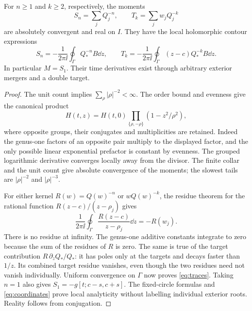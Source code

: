 \begin{proposition}\label{prop:trace}
For $n\ge1$ and $k\ge2$, respectively, the moments
\begin{equation}
 S_n=\sum_j Q_j^{-n},\qquad T_k=\sum_j w_jQ_j^{-k}
 \label{eq:moments}
\end{equation}
are absolutely convergent and real on $I$. They have the local
holomorphic contour expressions
\begin{equation}
 S_n=-\frac1{2\pi\ii}\oint_\Gamma Q_*^{-n}B\dd z,
 \qquad
 T_k=-\frac1{2\pi\ii}\oint_\Gamma(z-c)Q_*^{-k}B\dd z.
 \label{eq:traces}
\end{equation}
In particular $M=S_1$. Their time derivatives exist through arbitrary
exterior mergers and a double target.
\end{proposition}

\begin{proof}
The unit count implies $\sum_\rho|\rho|^{-2}<\infty$.
The order bound and evenness give the canonical product
\begin{equation}
 H(t,z)=H(t,0)\prod_{\{\rho,-\rho\}}
              (1-z^2/\rho^2),
 \label{eq:product}
\end{equation}
where opposite groups, their conjugates and multiplicities are retained.
Indeed the genus-one factors of an opposite pair multiply to the displayed
factor, and the only possible linear exponential prefactor is constant
by evenness. The grouped logarithmic derivative converges locally away
from the divisor. The finite collar and the unit count give absolute
convergence of the moments; the slowest tails are $|\rho|^{-2}$
and $|\rho|^{-3}$.

For either kernel $R(w)=Q(w)^{-n}$ or $wQ(w)^{-k}$, the residue theorem
for the rational function $R(z-c)/(z-\rho_j)$ gives
\[
 \frac1{2\pi\ii}\oint_\Gamma
                 \frac{R(z-c)}{z-\rho_j}\dd z=-R(w_j).
\]
There is no residue at infinity. The genus-one additive constants
integrate to zero because the sum of the residues of $R$ is zero.
The same is true of the target contribution $R\,\partial_z Q_*/Q_*$:
it has poles only at the targets and decays faster than $1/z$.
Its combined target residue vanishes, even though the two residues
need not vanish individually. Uniform convergence on $\Gamma$ now
proves \eqref{eq:traces}. Taking $n=1$ also gives
$S_1=-g[t;c-s,c+s]$. The fixed-circle formulas and
\eqref{eq:coordinates} prove local analyticity without labelling
individual exterior roots. Reality follows from conjugation.
\end{proof}

